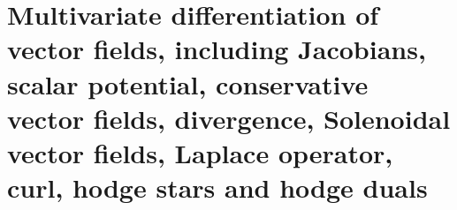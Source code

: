 
\chapter{Multivariate differentiation of vector fields, including Jacobians, scalar potential, conservative vector fields, divergence, Solenoidal vector fields, Laplace operator, curl, hodge stars and hodge duals}

